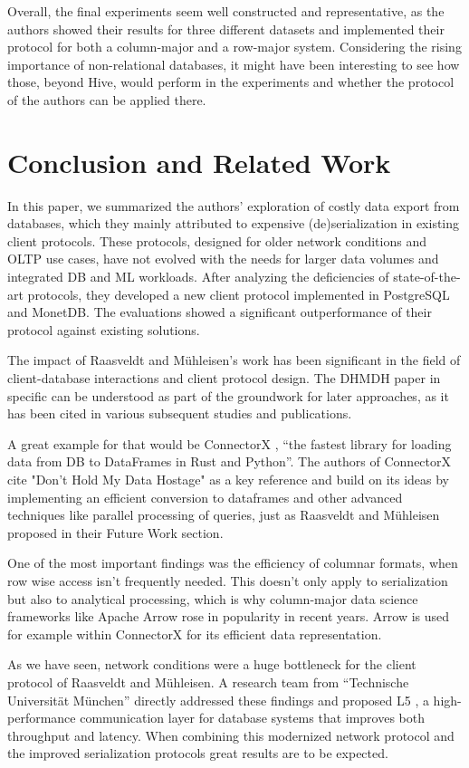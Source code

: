 \documentclass[sigconf]{acmart}
\begin{document}
Overall, the final experiments seem well constructed and representative, as the authors showed their results for three different datasets and implemented their protocol for both a column-major and a row-major system. Considering the rising importance of non-relational databases, it might have been interesting to see how those, beyond Hive, would perform in the experiments and whether the protocol of the authors can be applied there.

\section{Conclusion and Related Work}
In this paper, we summarized the authors’ exploration of costly data export from databases, which they mainly attributed to expensive (de)serialization in existing client protocols. These protocols, designed for older network conditions and OLTP use cases, have not evolved with the needs for larger data volumes and integrated DB and ML workloads. After analyzing the deficiencies of state-of-the-art protocols, they developed a new client protocol implemented in PostgreSQL and MonetDB. The evaluations showed a significant outperformance of their protocol against existing solutions.

The impact of Raasveldt and Mühleisen's work has been significant in the field of client-database interactions and client protocol design. The DHMDH paper in specific can be understood as part of the groundwork for later approaches, as it has been cited in various subsequent studies and publications. 

A great example for that would be ConnectorX \cite{wang2022connectorx}, “the fastest library for loading data from DB to DataFrames in Rust and Python”. The authors of ConnectorX cite "Don't Hold My Data Hostage" as a key reference and build on its ideas by implementing an efficient conversion to dataframes and other advanced techniques like parallel processing of queries, just as Raasveldt and Mühleisen proposed in their Future Work section. 

One of the most important findings was the efficiency of columnar formats, when row wise access isn’t frequently needed. This doesn’t only apply to serialization but also to analytical processing, which is why column-major data science frameworks like Apache Arrow \cite{ApacheArrow} rose in popularity in recent years. Arrow is used for example within ConnectorX for its efficient data representation.

As we have seen, network conditions were a huge bottleneck for the client protocol of Raasveldt and Mühleisen. A research team from “Technische Universität München” directly addressed these findings and proposed L5 \cite{Fent2020LowLatency}, a high-performance communication layer for database systems that improves both throughput and latency. When combining this modernized network protocol and the improved serialization protocols great results are to be expected. 



\end{document}
